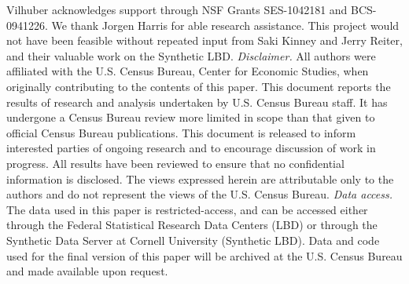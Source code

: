 
Vilhuber acknowledges support through NSF Grants SES-1042181 and BCS-0941226. We thank 
Jorgen Harris for 
able research assistance.
This project would not have been feasible without  repeated input from Saki Kinney and Jerry 
Reiter, and their valuable work on the Synthetic LBD. 
%
\textit{Disclaimer.}
All authors were affiliated with the U.S. Census Bureau, Center for Economic Studies, when 
originally contributing to the contents of this paper. 
This document reports the results of research and analysis
undertaken by U.S. Census Bureau staff. It has undergone a Census
Bureau review more limited in scope than that given to official Census
Bureau publications. This document is released to inform interested
parties of ongoing research and to encourage discussion of work in
progress. All results have been reviewed to ensure that no confidential information is
disclosed. The views expressed herein are attributable only to the
authors and do not represent the views of the U.S. Census Bureau. 
%
\textit{Data access.}
The data used in this paper is restricted-access, and can be accessed either through the Federal 
Statistical Research Data Centers (LBD) or through the Synthetic Data Server at Cornell University 
(Synthetic LBD). Data and code used for the final version of this paper will be archived at the U.S. 
Census Bureau and made available upon request. 

